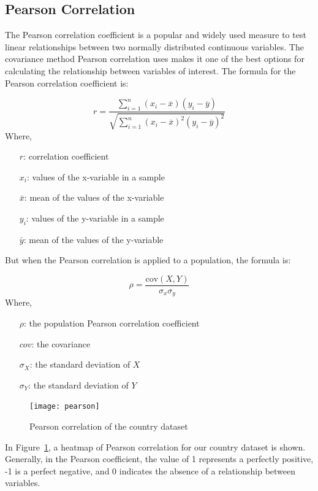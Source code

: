 \documentclass{swfuthesise}
\begin{document}
\subsection{Pearson Correlation}

The Pearson correlation coefficient is a popular and widely used measure to test linear
relationships between two normally distributed continuous variables. The covariance method
Pearson correlation uses makes it one of the best options for calculating the relationship
between variables of interest. The formula for the Pearson correlation coefficient is:

\[
  r = \frac{{}\sum_{i=1}^{n} (x_i - \overline{x})(y_i - \overline{y})}
  {\sqrt{\sum_{i=1}^{n} (x_i - \overline{x})^2(y_i - \overline{y})^2}}
\]
Where,
\begin{itemize}[itemsep=-1.5ex]
\item[\(r\):] correlation coefficient
\item[\(x_{i}\):] values of the x-variable in a sample
\item[\(\bar{x}\):] mean of the values of the x-variable
\item[\(y_{i}\):] values of the y-variable in a sample
\item[\(\bar{y}\):] mean of the values of the y-variable
\end{itemize}
But when the Pearson correlation is applied to a population, the formula is: 

\[
  \rho = \frac{\text{cov}(X,Y)}{\sigma_x \sigma_y}
\]
Where,
\begin{itemize}[itemsep=-1.5ex]
\item[\(\rho\):] the population Pearson correlation coefficient
\item[\(cov\):] the covariance
\item[\(\sigma_X\):] the standard deviation of \(X\)
\item[\(\sigma_Y\):] the standard deviation of \(Y\)
\end{itemize}

\begin{figure}[!htp]
  \centering \texttt{[image: pearson]}
  \caption{Pearson correlation of the country dataset}
  \label{fig:pearson}
\end{figure}

In Figure~\ref{fig:pearson}, a heatmap of Pearson correlation for our country dataset is shown.  Generally, in the Pearson coefficient, the value of 1 represents a perfectly
positive, -1 is a perfect negative, and 0 indicates the absence of a relationship between
variables.
\end{document}
